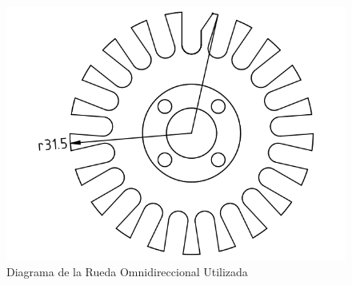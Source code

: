 \documentclass[twocolumn,10pt]{amrob}
\begin{document}
\begin{figure}[t]
  \centering
    \includegraphics[scale=0.2]{rueda.png}
  \caption{Diagrama de la Rueda Omnidireccional Utilizada}
  \label{fig:ruedaOmni}
\end{figure}
\end{document}
